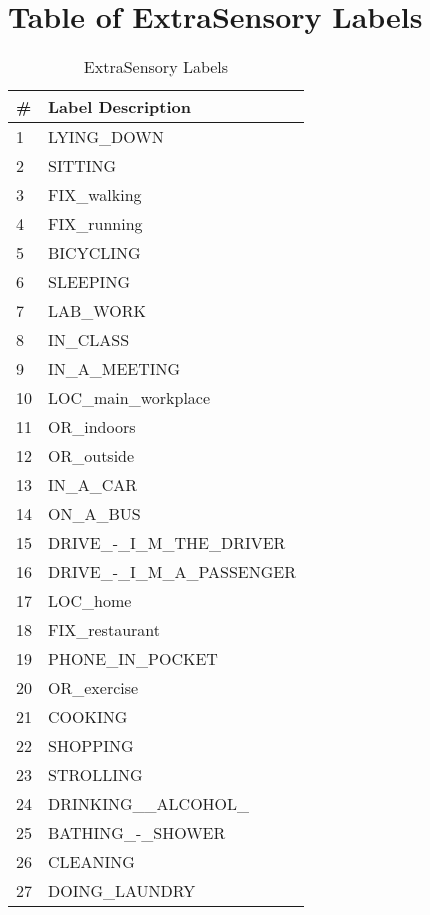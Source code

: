 \documentclass{UoNMCHA}
\numberwithin{equation}{section}
\begin{document}
\section{Table of ExtraSensory Labels}\label{apx:ExtraSensoryLabels}
\begin{table}[h]
\begin{center}  
\caption{ExtraSensory Labels \cite{Vaizman2017}}\label{tab:ExtraSensoryLabels}
\begin{tabular}{ll}
    \hline\hline
\# & Label Description            \\ \hline 
1  & LYING\_DOWN                  \\
2  & SITTING                      \\
3  & FIX\_walking                 \\
4  & FIX\_running                 \\
5  & BICYCLING                    \\
6  & SLEEPING                     \\
7  & LAB\_WORK                    \\
8  & IN\_CLASS                    \\
9  & IN\_A\_MEETING               \\
10 & LOC\_main\_workplace         \\
11 & OR\_indoors                  \\
12 & OR\_outside                  \\
13 & IN\_A\_CAR                   \\
14 & ON\_A\_BUS                   \\
15 & DRIVE\_-\_I\_M\_THE\_DRIVER  \\
16 & DRIVE\_-\_I\_M\_A\_PASSENGER \\
17 & LOC\_home                    \\
18 & FIX\_restaurant              \\
19 & PHONE\_IN\_POCKET            \\
20 & OR\_exercise                 \\
21 & COOKING                      \\
22 & SHOPPING                     \\
23 & STROLLING                    \\
24 & DRINKING\_\_ALCOHOL\_        \\
25 & BATHING\_-\_SHOWER           \\
26 & CLEANING                     \\
27 & DOING\_LAUNDRY               \\

\end{tabular}
\end{center}
\end{table}
\end{document}
